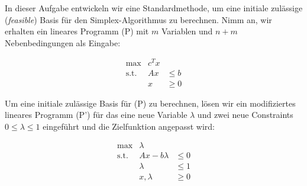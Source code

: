 \documentclass{uebung_cs}
\begin{document}
\begin{aufgabe}
%
%
%
%
	In dieser Aufgabe entwickeln wir eine Standardmethode, um eine initiale zulässige (\textit{feasible}) Basis für den Simplex-Algorithmus zu berechnen. Nimm an, wir erhalten ein lineares Programm (P) mit $m$ Variablen und $n + m$ Nebenbedingungen als Eingabe:
	
	\[
		\begin{array}{rrl}
			\text{max}   &  c^T x &  	    \\
			\text{s.t.}  &	Ax & \leq b \\
						 &	x  & \geq 0
		\end{array}
	\]
	
	Um eine initiale zulässige Basis für (P) zu berechnen, lösen wir ein modifiziertes lineares Programm (P') für das eine neue Variable $\lambda$ und zwei neue Constraints $0 \leq \lambda \leq 1$ eingeführt und die Zielfunktion angepasst wird:
	
	\[
		\begin{array}{rrl}
			\text{max}   &        \lambda & 	   \\
			\text{s.t.}  &	Ax - b\lambda & \leq 0 \\
						 &		  \lambda & \leq 1 \\
						 &	 x, \lambda   & \geq 0
		\end{array}
	\]
	

\end{aufgabe}
\end{document}
